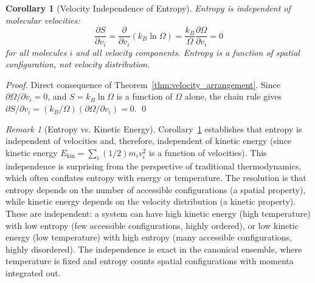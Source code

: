 \documentclass[12pt,a4paper]{article}
\newtheorem{corollary}[theorem]{Corollary}
\theoremstyle{definition}
\theoremstyle{remark}
\newtheorem{remark}[theorem]{Remark}
\begin{document}
\begin{corollary}[Velocity Independence of Entropy]
\label{cor:velocity_entropy_independent}
Entropy is independent of molecular velocities:
\begin{equation}
\frac{\partial S}{\partial v_i} = \frac{\partial}{\partial v_i} (k_B \ln \Omega) = \frac{k_B}{\Omega} \frac{\partial \Omega}{\partial v_i} = 0
\label{eq:entropy_velocity_independent}
\end{equation}
for all molecules $i$ and all velocity components. Entropy is a function of spatial configuration, not velocity distribution.
\end{corollary}

\begin{proof}
Direct consequence of Theorem~\ref{thm:velocity_arrangement}. Since $\partial \Omega / \partial v_i = 0$, and $S = k_B \ln \Omega$ is a function of $\Omega$ alone, the chain rule gives $\partial S / \partial v_i = (k_B / \Omega) (\partial \Omega / \partial v_i) = 0$. \qed
\end{proof}

\begin{remark}[Entropy vs. Kinetic Energy]
\label{rem:entropy_kinetic}
Corollary~\ref{cor:velocity_entropy_independent} establishes that entropy is independent of velocities and, therefore, independent of kinetic energy (since kinetic energy $E_{\text{kin}} = \sum_i (1/2) m_i v_i^2$ is a function of velocities). This independence is surprising from the perspective of traditional thermodynamics, which often conflates entropy with energy or temperature. The resolution is that entropy depends on the number of accessible configurations (a spatial property), while kinetic energy depends on the velocity distribution (a kinetic property). These are independent: a system can have high kinetic energy (high temperature) with low entropy (few accessible configurations, highly ordered), or low kinetic energy (low temperature) with high entropy (many accessible configurations, highly disordered). The independence is exact in the canonical ensemble, where temperature is fixed and entropy counts spatial configurations with momenta integrated out.
\end{remark}
\end{document}
